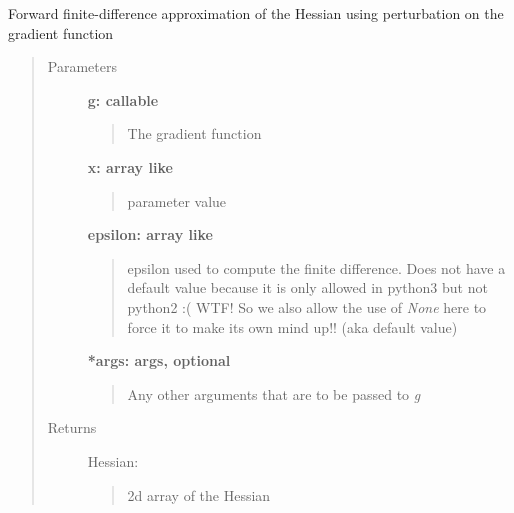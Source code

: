 \documentclass[letterpaper,10pt,english]{sphinxmanual}
\begin{document}
\begin{fulllineitems}
Forward finite-difference approximation of the Hessian using 
perturbation on the gradient function
\begin{quote}\begin{description}
\item[{Parameters}] \leavevmode
\textbf{g: callable}
\begin{quote}

The gradient function
\end{quote}

\textbf{x: array like}
\begin{quote}

parameter value
\end{quote}

\textbf{epsilon: array like}
\begin{quote}

epsilon used to compute the finite difference.  Does not 
have a default value because it is only allowed in 
python3 but not python2 :( WTF!  So we also allow the
use of \emph{None} here to force it to make its own mind
up!! (aka default value)
\end{quote}

\textbf{*args: args, optional}
\begin{quote}

Any other arguments that are to be passed to \emph{g}
\end{quote}

\item[{Returns}] \leavevmode
Hessian: \href{http://docs.scipy.org/doc/numpy/reference/generated/numpy.ndarray.html\#numpy.ndarray}{}
\begin{quote}

2d array of the Hessian
\end{quote}

\end{description}\end{quote}

\end{fulllineitems}
\end{document}
